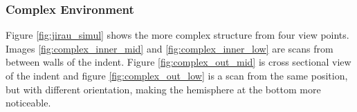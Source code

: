 \subsubsection{Complex Environment}

Figure \ref{fig:jirau_simul} shows the more complex structure from four view
points. Images \ref{fig:complex_inner_mid} and \ref{fig:complex_inner_low} are scans from between walls of the indent. Figure
\ref{fig:complex_out_mid} is cross sectional view of the indent and figure
\ref{fig:complex_out_low} is a scan from the same position, but with different
orientation, making the hemisphere at the bottom more noticeable.

\begin{figure}[ht]
    \centering {}%
    \hfill {}%
    \\

\end{figure}
